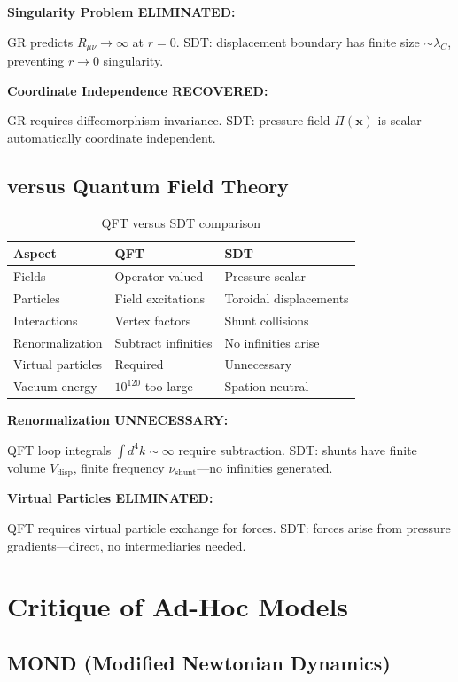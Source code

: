 \textbf{Singularity Problem ELIMINATED:}

GR predicts $R_{\mu\nu} \to \infty$ at $r=0$. SDT: displacement boundary has finite size $\sim \lambda_C$, preventing $r \to 0$ singularity.

\textbf{Coordinate Independence RECOVERED:}

GR requires diffeomorphism invariance. SDT: pressure field $\Pi(\mathbf{x})$ is scalar—automatically coordinate independent.

\subsection{versus Quantum Field Theory}

\begin{table}[h]
\centering
\begin{tabular}{|l|l|l|}
\hline
\textbf{Aspect} & \textbf{QFT} & \textbf{SDT} \\
\hline
Fields & Operator-valued & Pressure scalar \\
Particles & Field excitations & Toroidal displacements \\
Interactions & Vertex factors & Shunt collisions \\
Renormalization & Subtract infinities & No infinities arise \\
Virtual particles & Required & Unnecessary \\
Vacuum energy & $10^{120}$ too large & Spation neutral \\
\hline
\end{tabular}
\caption{QFT versus SDT comparison}
\end{table}

\textbf{Renormalization UNNECESSARY:}

QFT loop integrals $\int d^4k \sim \infty$ require subtraction. SDT: shunts have finite volume $V_{\text{disp}}$, finite frequency $\nu_{\text{shunt}}$—no infinities generated.

\textbf{Virtual Particles ELIMINATED:}

QFT requires virtual particle exchange for forces. SDT: forces arise from pressure gradients—direct, no intermediaries needed.

\section{Critique of Ad-Hoc Models}

\subsection{MOND (Modified Newtonian Dynamics)}

